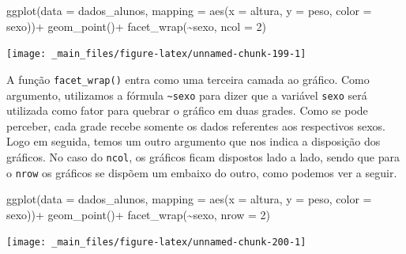 \documentclass[
  brazilian,
]{book}
\newenvironment{Shaded}{\begin{snugshade}}{\end{snugshade}}
\newcommand{\AttributeTok}[1]{\textcolor[rgb]{0.77,0.63,0.00}{#1}}
\newcommand{\DecValTok}[1]{\textcolor[rgb]{0.00,0.00,0.81}{#1}}
\newcommand{\FunctionTok}[1]{\textcolor[rgb]{0.00,0.00,0.00}{#1}}
\newcommand{\NormalTok}[1]{#1}
\newcommand{\SpecialCharTok}[1]{\textcolor[rgb]{0.00,0.00,0.00}{#1}}
\begin{document}
\begin{Shaded}
\begin{Highlighting}[]
\FunctionTok{ggplot}\NormalTok{(}\AttributeTok{data =}\NormalTok{ dados\_alunos,}
       \AttributeTok{mapping =} \FunctionTok{aes}\NormalTok{(}\AttributeTok{x =}\NormalTok{ altura,}
                     \AttributeTok{y =}\NormalTok{ peso,}
                     \AttributeTok{color =}\NormalTok{ sexo))}\SpecialCharTok{+}
  \FunctionTok{geom\_point}\NormalTok{()}\SpecialCharTok{+}
  \FunctionTok{facet\_wrap}\NormalTok{(}\SpecialCharTok{\textasciitilde{}}\NormalTok{sexo, }\AttributeTok{ncol =} \DecValTok{2}\NormalTok{)}
\end{Highlighting}
\end{Shaded}

\begin{center}\texttt{[image: \_main\_files/figure-latex/unnamed-chunk-199-1]} \end{center}

A função \texttt{facet\_wrap()} entra como uma terceira camada ao gráfico. Como argumento, utilizamos a fórmula \texttt{\textasciitilde{}sexo} para dizer que a variável \texttt{sexo} será utilizada como fator para quebrar o gráfico em duas grades. Como se pode perceber, cada grade recebe somente os dados referentes aos respectivos sexos. Logo em seguida, temos um outro argumento que nos indica a disposição dos gráficos. No caso do \texttt{ncol}, os gráficos ficam dispostos lado a lado, sendo que para o \texttt{nrow} os gráficos se dispõem um embaixo do outro, como podemos ver a seguir.

\begin{Shaded}
\begin{Highlighting}[]
\FunctionTok{ggplot}\NormalTok{(}\AttributeTok{data =}\NormalTok{ dados\_alunos,}
       \AttributeTok{mapping =} \FunctionTok{aes}\NormalTok{(}\AttributeTok{x =}\NormalTok{ altura,}
                     \AttributeTok{y =}\NormalTok{ peso,}
                     \AttributeTok{color =}\NormalTok{ sexo))}\SpecialCharTok{+}
  \FunctionTok{geom\_point}\NormalTok{()}\SpecialCharTok{+}
  \FunctionTok{facet\_wrap}\NormalTok{(}\SpecialCharTok{\textasciitilde{}}\NormalTok{sexo, }\AttributeTok{nrow =} \DecValTok{2}\NormalTok{)}
\end{Highlighting}
\end{Shaded}

\begin{center}\texttt{[image: \_main\_files/figure-latex/unnamed-chunk-200-1]} \end{center}
\end{document}
